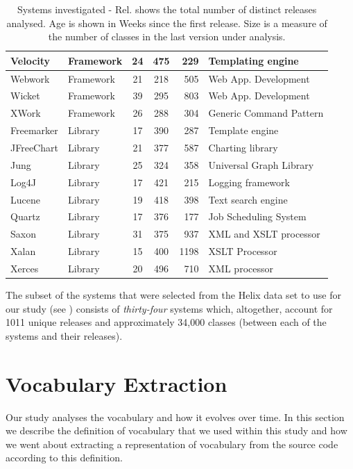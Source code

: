 \begin{table}[!]
\begin{tabular}{|l|l||c|c|r|p{}|}
\hline
Velocity&Framework&24 & 475 & 229 & Templating engine\\
\hline
Webwork&Framework&21 & 218 & 505 & Web App. Development\\
\hline
Wicket&Framework&39 & 295 & 803 & Web App. Development\\
\hline
XWork&Framework&26 & 288 & 304 & Generic Command Pattern\\
\hline
Freemarker&Library&17 & 390 & 287 & Template engine\\
\hline
JFreeChart&Library&21 & 377 & 587 & Charting library\\
\hline
Jung&Library&25 & 324 & 358 & Universal Graph Library\\
\hline
Log4J&Library&17 & 421 & 215 & Logging framework\\
\hline
Lucene&Library&19 & 418 & 398 & Text search engine\\
\hline
Quartz&Library&17 & 376 & 177 & Job Scheduling System\\
\hline
Saxon&Library&31 & 375 & 937 & XML and XSLT processor\\
\hline
Xalan&Library&15 & 400 & 1198 & XSLT Processor\\
\hline
Xerces&Library&20 & 496 & 710 & XML processor\\
\hline
\end{tabular}
\caption{Systems investigated - Rel. shows the total number of distinct releases analysed. Age is shown in Weeks since the first release. Size is a measure of the number of classes in the last version under analysis.}
\label{tab:systems}
\end{table}

The subset of the systems that were selected from the Helix data set to use for our study (see ) consists of \emph{thirty-four} systems which, altogether, account for 1011 unique releases and approximately 34,000 classes (between each of the systems and their releases).



\section{Vocabulary Extraction} %
\label{sec:vocabulary_extraction}

Our study analyses the vocabulary and how it evolves over time. In this section we describe the definition of vocabulary that we used within this study and how we went about extracting a representation of vocabulary from the source code according to this definition.

